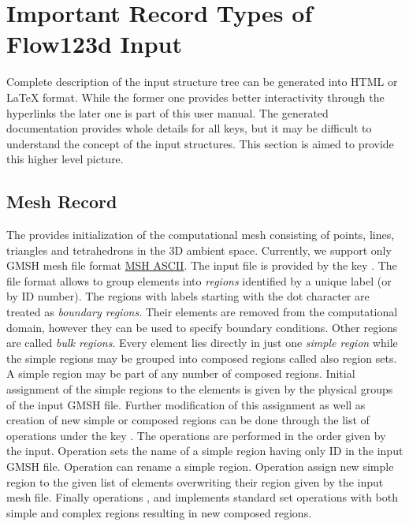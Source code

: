 \section{Important Record Types of Flow123d Input}
Complete description of the input structure tree can be generated into HTML or LaTeX format. While the former one provides better interactivity 
through the hyperlinks the later one is part of this user manual. The generated documentation provides whole details for all keys, but 
it may be difficult to understand the concept of the input structures. This section is aimed to provide this higher level picture.

\subsection{Mesh Record}
\label{sec:Mesh}
The  provides initialization of the computational mesh consisting of points, lines, triangles and tetrahedrons in the 3D ambient space.
Currently, we support only GMSH mesh file format \href{http://geuz.org/gmsh/doc/texinfo/gmsh.html#MSH-ASCII-file-format}{MSH ASCII}. 
The input file is provided by the key . The file format allows to group elements into {\it regions} 
identified by a unique label (or by ID number). The regions with labels starting with the dot character are treated as {\it boundary regions}. 
Their elements are removed from the computational domain, however they can be used to specify boundary
conditions. Other regions are called {\it bulk regions}. Every element lies directly in just one {\it simple region} while the simple regions may be 
grouped into composed regions called also region sets. A simple region may be part of any number of composed regions.
Initial assignment of the simple regions to the elements is given by the physical groups of the input GMSH file. Further
modification of this assignment as well as creation of new simple or composed regions can be done 
through the list of operations under the key . The operations are performed in the order given by the input.
Operation  sets the name of a simple region having only ID in the input GMSH file. Operation 
 can rename a simple region. Operation 
assign new simple region to the given list of elements overwriting their region given by the input mesh file. Finally operations 
,  and 
implements standard set operations with both simple and complex regions resulting in new composed regions.




